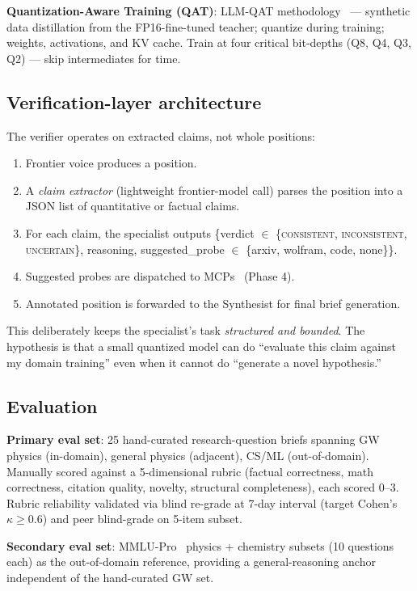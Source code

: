 \documentclass[11pt]{article}
\begin{document}
\textbf{Quantization-Aware Training (QAT)}: LLM-QAT methodology~\cite{liu2023llmqat} --- synthetic data distillation from the FP16-fine-tuned teacher; quantize during training; weights, activations, and KV cache. Train at four critical bit-depths (Q8, Q4, Q3, Q2) --- skip intermediates for time.

\subsection{Verification-layer architecture}

The verifier operates on extracted claims, not whole positions:
\begin{enumerate}
  \item Frontier voice produces a position.
  \item A \emph{claim extractor} (lightweight frontier-model call) parses the position into a JSON list of quantitative or factual claims.
  \item For each claim, the specialist outputs \{verdict $\in$ \{\textsc{consistent}, \textsc{inconsistent}, \textsc{uncertain}\}, reasoning, suggested\_probe $\in$ \{arxiv, wolfram, code, none\}\}.
  \item Suggested probes are dispatched to MCPs~\cite{anthropic2024mcp} (Phase 4).
  \item Annotated position is forwarded to the Synthesist for final brief generation.
\end{enumerate}

This deliberately keeps the specialist's task \emph{structured and bounded}. The hypothesis is that a small quantized model can do ``evaluate this claim against my domain training'' even when it cannot do ``generate a novel hypothesis.''

\subsection{Evaluation}

\textbf{Primary eval set}: 25 hand-curated research-question briefs spanning GW physics (in-domain), general physics (adjacent), CS/ML (out-of-domain). Manually scored against a 5-dimensional rubric (factual correctness, math correctness, citation quality, novelty, structural completeness), each scored 0--3. Rubric reliability validated via blind re-grade at 7-day interval (target Cohen's $\kappa \geq 0.6$) and peer blind-grade on 5-item subset.

\textbf{Secondary eval set}: MMLU-Pro~\cite{wang2024mmlupro} physics + chemistry subsets (10 questions each) as the out-of-domain reference, providing a general-reasoning anchor independent of the hand-curated GW set.
\end{document}
